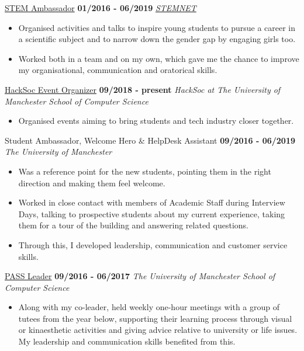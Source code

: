 \documentclass[]{friggeri-cv}
\begin{document}
\begin{entrylist}
  \entry
    {}
    {\href{http://www.stemnet.org.uk/ambassadors/}{STEM Ambassador}}
    {\textbf{01/2016 - 06/2019}}
    {\emph{\href{http://www.stemnet.org.uk/}{STEMNET}}}
    \begin{itemize}
        \item Organised activities and talks to inspire young students to pursue a career in a scientific subject and to narrow down the gender gap by engaging girls too.
        \item Worked both in a team and on my own, which gave me the chance to improve my organisational, communication and oratorical skills.\\
    \end{itemize}
\entry
    {}
    {\href{https://www.hacksoc.com}{HackSoc Event Organizer}}
    {\textbf{09/2018 - present}}
    {\emph{HackSoc at The University of Manchester School of Computer Science}}
    \begin{itemize}
        \item Organised events aiming to bring students and tech industry closer together.\\
    \end{itemize}
   \entry
    {}
    {Student Ambassador, Welcome Hero \& HelpDesk Assistant}
    {\textbf{09/2016 - 06/2019}}
    {\emph{The University of Manchester}}
    \begin{itemize}
        \item Was a reference point for the new students, pointing them in the right direction and making them feel welcome. 
        \item Worked in close contact with members of Academic Staff during Interview Days, talking to prospective students about my current experience, taking them for a tour of the building and answering related questions. 
        \item Through this, I developed leadership, communication and customer service skills.\\
    \end{itemize}
  \entry
    {}
    {\href{http://www.pass.manchester.ac.uk/}{PASS Leader}}
    {\textbf{09/2016 - 06/2017}}
    {\emph{The University of Manchester School of Computer Science}}
    \begin{itemize}
        \item Along with my co-leader, held weekly one-hour meetings with a group of tutees from the year below, supporting their learning process through visual or kinaesthetic activities and giving advice relative to university or life issues. My leadership and communication skills benefited from this.\\

\end{itemize}
\end{entrylist}
\end{document}
